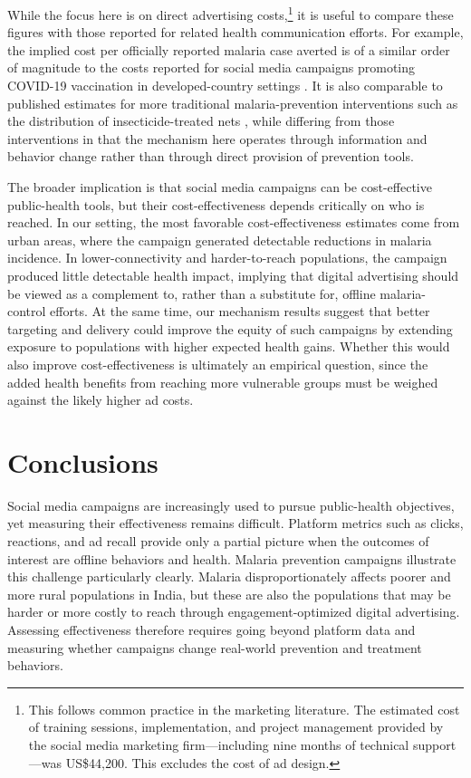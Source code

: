 While the focus here is on direct advertising costs,\footnote{This follows common practice in the marketing literature. The estimated cost of training sessions, implementation, and project management provided by the social media marketing firm—including nine months of technical support—was US\$44{,}200. This excludes the cost of ad design.} it is useful to compare these figures with those reported for related health communication efforts. For example, the implied cost per officially reported malaria case averted is of a similar order of magnitude to the costs reported for social media campaigns promoting COVID-19 vaccination in developed-country settings \citep{atheycovid2023}. It is also comparable to published estimates for more traditional malaria-prevention interventions such as the distribution of insecticide-treated nets \citep{conteh2021costs}, while differing from those interventions in that the mechanism here operates through information and behavior change rather than through direct provision of prevention tools.

The broader implication is that social media campaigns can be cost-effective public-health tools, but their cost-effectiveness depends critically on who is reached. In our setting, the most favorable cost-effectiveness estimates come from urban areas, where the campaign generated detectable reductions in malaria incidence. In lower-connectivity and harder-to-reach populations, the campaign produced little detectable health impact, implying that digital advertising should be viewed as a complement to, rather than a substitute for, offline malaria-control efforts. At the same time, our mechanism results suggest that better targeting and delivery could improve the equity of such campaigns by extending exposure to populations with higher expected health gains. Whether this would also improve cost-effectiveness is ultimately an empirical question, since the added health benefits from reaching more vulnerable groups must be weighed against the likely higher ad costs.

\section{Conclusions}
Social media campaigns are increasingly used to pursue public-health objectives, yet measuring their effectiveness remains difficult. Platform metrics such as clicks, reactions, and ad recall provide only a partial picture when the outcomes of interest are offline behaviors and health. Malaria prevention campaigns illustrate this challenge particularly clearly. Malaria disproportionately affects poorer and more rural populations in India, but these are also the populations that may be harder or more costly to reach through engagement-optimized digital advertising. Assessing effectiveness therefore requires going beyond platform data and measuring whether campaigns change real-world prevention and treatment behaviors.

